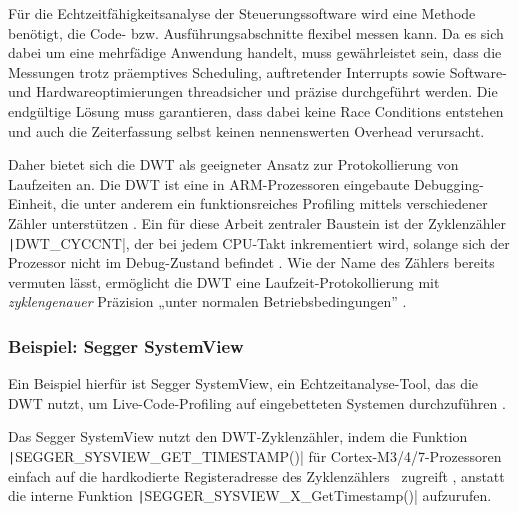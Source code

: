 Für die Echtzeitfähigkeitsanalyse der Steuerungssoftware wird eine Methode
benötigt, die Code- bzw. Ausführungsabschnitte flexibel messen kann. Da es sich
dabei um eine mehrfädige Anwendung handelt, muss gewährleistet sein, dass die
Messungen trotz präemptives Scheduling, auftretender Interrupts sowie Software-
und Hardwareoptimierungen threadsicher und präzise durchgeführt werden. Die
endgültige Lösung muss garantieren, dass dabei keine Race Conditions entstehen
und auch die Zeiterfassung selbst keinen nennenswerten Overhead verursacht.

Daher bietet sich die \ac{DWT} als geeigneter Ansatz zur Protokollierung von
Laufzeiten an. Die DWT ist eine in ARM-Prozessoren eingebaute Debugging-Einheit,
die unter anderem ein funktionsreiches Profiling mittels verschiedener Zähler
unterstützen \cite{ARMv7_ref_man_dwt_profiling}. Ein für diese Arbeit zentraler
Baustein ist der Zyklenzähler \texttt|DWT_CYCCNT|, der bei jedem CPU-Takt
inkrementiert wird, solange sich der Prozessor nicht im Debug-Zustand befindet
\cite{ARMv7_ref_man_dwt_cycle}. Wie der Name des Zählers bereits vermuten lässt,
ermöglicht die DWT eine Laufzeit-Protokollierung mit \textit{zyklengenauer}
Präzision „unter normalen Betriebsbedingungen”
\cite{ARMv7_ref_man_dwt_profiling}.

\subsubsection*{Beispiel: Segger SystemView}

Ein Beispiel hierfür ist Segger SystemView, ein Echtzeitanalyse-Tool, das die
DWT nutzt, um Live-Code-Profiling auf eingebetteten Systemen durchzuführen
\cite{SEGGER_SystemView}.

Das Segger SystemView nutzt den DWT-Zyklenzähler, indem die Funktion \linebreak
\texttt|SEGGER_SYSVIEW_GET_TIMESTAMP()| für Cortex-M3/4/7-Prozessoren
einfach auf die hardkodierte Registeradresse des
Zyklenzählers~\cite{Arm_DWT_Programmers_Model} zugreift \cite[S.
65]{Segger_SystemView_manual}, anstatt die interne Funktion
\texttt|SEGGER_SYSVIEW_X_GetTimestamp()| aufzurufen.

